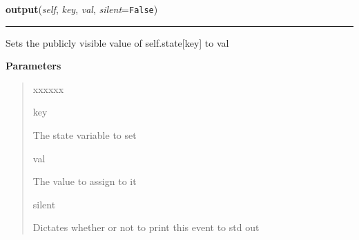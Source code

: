     \label{datk:core:distalgs:Process:output}

    \vspace{0.5ex}

\hspace{.8\funcindent}\begin{boxedminipage}{\funcwidth}

    \raggedright \textbf{output}(\textit{self}, \textit{key}, \textit{val}, \textit{silent}={\tt False})

    \vspace{-1.5ex}

    \rule{\textwidth}{0.5\fboxrule}
\setlength{\parskip}{2ex}
    Sets the publicly visible value of self.state[key] to val

\setlength{\parskip}{1ex}
      \textbf{Parameters}
      \vspace{-1ex}

      \begin{quote}
        \begin{Ventry}{xxxxxx}

          \item[key]

          The state variable to set

          \item[val]

          The value to assign to it

          \item[silent]

          Dictates whether or not to print this event to std out

        \end{Ventry}

      \end{quote}

    \end{boxedminipage}

    \label{datk:core:distalgs:Process:send_to_all_neighbors}

    \vspace{0.5ex}

